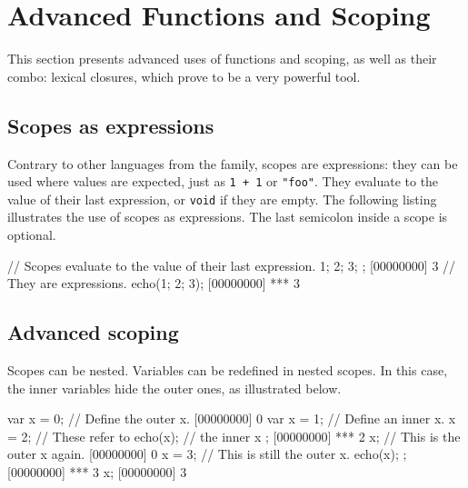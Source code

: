 
\chapter{Advanced Functions and Scoping}
\label{sec:tut:function}

This section presents advanced uses of functions and scoping, as well as
their combo: lexical closures, which prove to be a very powerful tool.

\section{Scopes as expressions}

Contrary to other languages from the \langC family, scopes are expressions: they
can be used where values are expected, just as \lstinline|1 + 1| or
\lstinline|"foo"|.  They evaluate to the value of their last expression, or
\lstinline|void| if they are empty. The following listing illustrates the
use of scopes as expressions. The last semicolon inside a scope is optional.

\begin{urbiscript}[firstnumber=1]
// Scopes evaluate to the value of their last expression.
{ 1; 2; 3; };
[00000000] 3
// They are expressions.
echo({1; 2; 3});
[00000000] *** 3
\end{urbiscript}

\section{Advanced scoping}

Scopes can be nested. Variables can be redefined in nested scopes. In this
case, the inner variables hide the outer ones, as illustrated below.

\begin{urbiscript}
var x = 0;   // Define the outer x.
[00000000] 0
{
  var x = 1; // Define an inner x.
  x = 2;     // These refer to
  echo(x);   // the inner x
};
[00000000] *** 2
x;           // This is the outer x again.
[00000000] 0
{
  x = 3;     // This is still the outer x.
  echo(x);
};
[00000000] *** 3
x;
[00000000] 3
\end{urbiscript}

